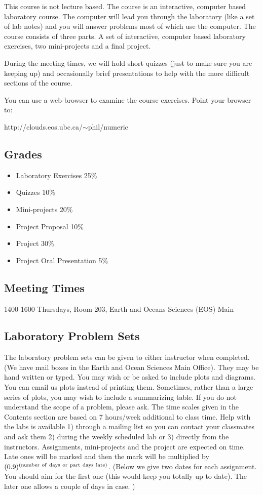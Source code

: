 \documentclass[11pt]{article}
\begin{document}
This course is not lecture based. The course is an interactive, computer based laboratory course. The computer will lead you through the laboratory (like a set of lab notes) and you will answer problems most of which use the computer. The course consists of three parts. A set of  interactive, computer based
laboratory exercises, two mini-projects and a final project.

During the meeting times, we will hold short quizzes (just to make sure you are keeping up) and occasionally brief presentations to help with the more difficult sections of the course.

You can use a web-browser to examine the
course exercises. Point your browser to: 

http://clouds.eos.ubc.ca/$\sim$phil/numeric


\subsection*{Grades}

\begin{itemize}
\item       Laboratory Exercises 25\% 
\item	    Quizzes 10\%
\item 	    Mini-projects 20\%
\item       Project Proposal 10\%
\item       Project 30\% 
\item	    Project Oral Presentation 5\%
\end{itemize}

\subsection*{Meeting Times}

1400-1600 Thursdays, Room 203, Earth and Oceans Sciences (EOS) Main


\subsection*{Laboratory Problem Sets}

The laboratory problem sets can be given to either instructor when completed.
(We have mail boxes in the Earth and Ocean Sciences Main Office).
They may be hand written or typed.  You may wish or be asked to include
plots and diagrams.  You can email us plots instead of printing them.
Sometimes, rather than a large series of plots, you
may wish to include a summarizing table.  If you do not
understand the scope of a problem, please ask.  The time scales given
in the Contents section are based on 7 hours/week additional to class time.  
Help with the labs
is available 1) through a mailing list so you can contact your classmates
and ask them 2) during the weekly scheduled lab or 3) directly from the
instructors.  Assignments, mini-projects and the project are expected on
time.  Late ones will be marked and then the mark will be multiplied by
$(0.9)^{\rm (number\ of\ days\ or\ part\ days\ late)}$.
(Below we give two dates
for each assignment.  You should aim for the first one (this would keep you
totally up to date).  The later one allows a couple of days in case.
)
\end{document}
